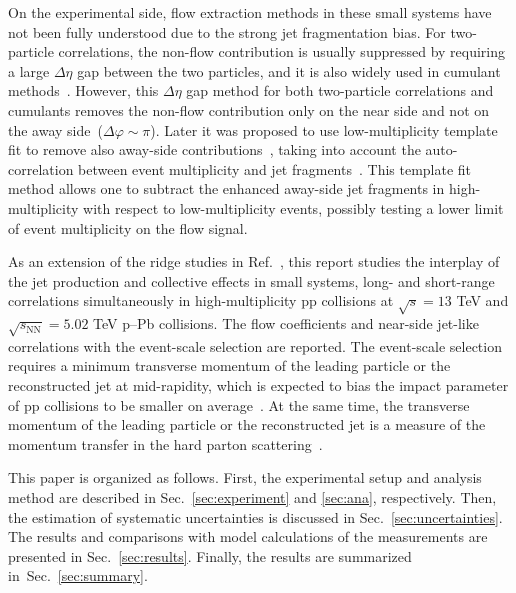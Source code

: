 On the experimental side, flow extraction methods in these small systems have not been fully understood due to the strong jet fragmentation bias. 
For two-particle correlations, the non-flow contribution is usually suppressed by requiring a large $\Delta\eta$ gap between the two particles,  and it is also widely used in cumulant methods~\cite{Bilandzic:2010jr, Acharya:2019vdf}. However, this $\Delta\eta$ gap method for both two-particle correlations and cumulants removes the non-flow contribution only on the near side and not on the away side~($\Delta\varphi\sim\pi$). Later it was proposed to use low-multiplicity template fit to remove also away-side contributions~\cite{ATLAS:2015hzw,ATLAS:2016yzd,ATLAS:2018ngv}, taking into account the auto-correlation between event multiplicity and jet fragments~\cite{CMS:2013ycn}. This template fit method allows one to subtract the enhanced away-side jet fragments in high-multiplicity with respect to low-multiplicity events, possibly testing a lower limit of event multiplicity on the flow signal.

As an extension of the ridge studies in Ref.~\cite{ALICE:2021nir}, this report studies the interplay of the jet production and collective effects in small systems, long- and short-range correlations simultaneously in high-multiplicity pp collisions at $\sqrt{s} =13$ TeV and $\sqrt{s_{\mathrm{NN}}}=5.02$ TeV p--Pb collisions. The flow coefficients and near-side jet-like correlations with the event-scale selection are reported. The event-scale selection requires a minimum transverse momentum of the leading particle or the reconstructed jet at mid-rapidity, which is expected to bias the impact parameter of pp collisions to be smaller on average~\cite{Sjostrand:1986ep,Frankfurt:2003td,Frankfurt:2010ea}. At the same time, the transverse momentum of the leading particle or the reconstructed jet is a measure of the momentum transfer in the hard parton scattering~\cite{Chatrchyan:2012tt,Chatrchyan:2011id}.

This paper is organized as follows. First, the experimental setup and analysis method are described in Sec.~\ref{sec:experiment} and \ref{sec:ana}, respectively. Then, the estimation of systematic uncertainties is discussed in Sec.~\ref{sec:uncertainties}. The results and comparisons with model calculations of the measurements are presented in Sec.~\ref{sec:results}. Finally, the results are summarized in~Sec.~\ref{sec:summary}.

 